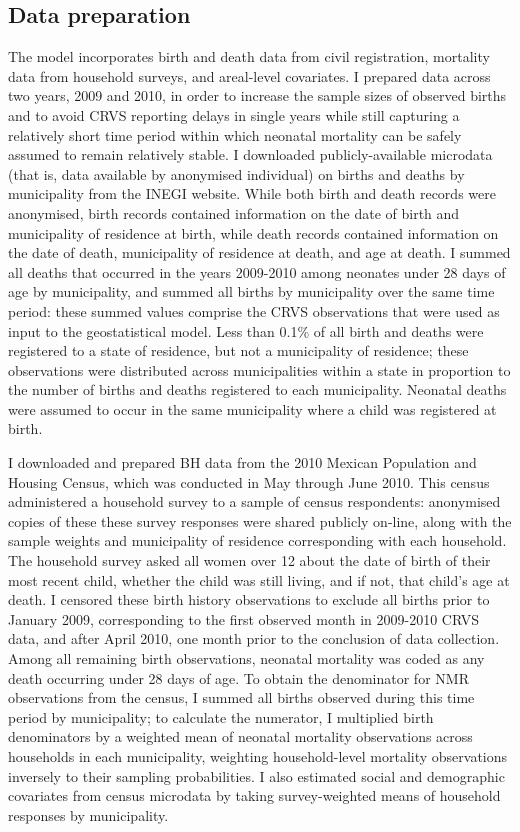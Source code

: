 \documentclass[
]{report}
\begin{document}
\hypertarget{data-preparation}{%
\subsection{Data preparation}\label{data-preparation}}

The model incorporates birth and death data from civil registration, mortality data from household surveys, and areal-level covariates. I prepared data across two years, 2009 and 2010, in order to increase the sample sizes of observed births and to avoid CRVS reporting delays in single years while still capturing a relatively short time period within which neonatal mortality can be safely assumed to remain relatively stable. I downloaded publicly-available microdata (that is, data available by anonymised individual) on births and deaths by municipality from the INEGI website.\autocite{INEGI2010} While both birth and death records were anonymised, birth records contained information on the date of birth and municipality of residence at birth, while death records contained information on the date of death, municipality of residence at death, and age at death. I summed all deaths that occurred in the years 2009-2010 among neonates under 28 days of age by municipality, and summed all births by municipality over the same time period: these summed values comprise the CRVS observations that were used as input to the geostatistical model. Less than 0.1\% of all birth and deaths were registered to a state of residence, but not a municipality of residence; these observations were distributed across municipalities within a state in proportion to the number of births and deaths registered to each municipality. Neonatal deaths were assumed to occur in the same municipality where a child was registered at birth.

I downloaded and prepared BH data from the 2010 Mexican Population and Housing Census, which was conducted in May through June 2010. This census administered a household survey to a sample of census respondents: anonymised copies of these these survey responses were shared publicly on-line, along with the sample weights and municipality of residence corresponding with each household.\autocite{INEGI2010a} The household survey asked all women over 12 about the date of birth of their most recent child, whether the child was still living, and if not, that child's age at death. I censored these birth history observations to exclude all births prior to January 2009, corresponding to the first observed month in 2009-2010 CRVS data, and after April 2010, one month prior to the conclusion of data collection. Among all remaining birth observations, neonatal mortality was coded as any death occurring under 28 days of age. To obtain the denominator for NMR observations from the census, I summed all births observed during this time period by municipality; to calculate the numerator, I multiplied birth denominators by a weighted mean of neonatal mortality observations across households in each municipality, weighting household-level mortality observations inversely to their sampling probabilities. I also estimated social and demographic covariates from census microdata by taking survey-weighted means of household responses by municipality.
\end{document}
